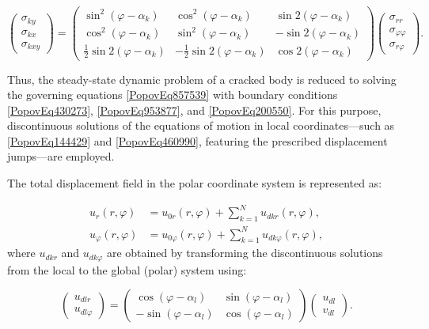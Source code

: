 \begin{equation} \label{PopovEq604994}
	\left(\begin{array}{c}
		\sigma_{ky} \\
		\sigma_{kx} \\
		\sigma_{kxy}
	\end{array}\right)
	=
	\left(\begin{array}{ccc}
		\sin^2(\varphi - \alpha_k) & \cos^2(\varphi - \alpha_k) & \sin 2(\varphi - \alpha_k) \\
		\cos^2(\varphi - \alpha_k) & \sin^2(\varphi - \alpha_k) & -\sin 2(\varphi - \alpha_k) \\
		\frac{1}{2} \sin 2(\varphi - \alpha_k) & -\frac{1}{2} \sin 2(\varphi - \alpha_k) & \cos 2(\varphi - \alpha_k)
	\end{array}\right)
	\left(\begin{array}{c}
		\sigma_{rr} \\
		\sigma_{\varphi\varphi} \\
		\sigma_{r\varphi}
	\end{array}\right).
\end{equation}

Thus, the steady-state dynamic problem of a cracked body is reduced to solving the governing equations \eqref{PopovEq857539} with boundary conditions \eqref{PopovEq430273}, \eqref{PopovEq953877}, and \eqref{PopovEq200550}. For this purpose, discontinuous solutions of the equations of motion in local coordinates—such as \eqref{PopovEq144429} and \eqref{PopovEq460990}, featuring the prescribed displacement jumps—are employed.

The total displacement field in the polar coordinate system is represented as:

\begin{equation} \label{PopovEq481837}
	\begin{aligned}
		u_r(r, \varphi) &= u_{0r}(r, \varphi) + \displaystyle\sum_{k=1}^{N} u_{dkr}(r, \varphi), \\
		u_{\varphi}(r, \varphi) &= u_{0\varphi}(r, \varphi) + \displaystyle\sum_{k=1}^{N} u_{dk\varphi}(r, \varphi),
	\end{aligned}
\end{equation}
where $u_{dkr}$ and $u_{dk\varphi}$ are obtained by transforming the discontinuous solutions from the local to the global (polar) system using:

\begin{equation} \label{31.46)}
	\left(\begin{array}{c}
		u_{dlr} \\
		u_{dl\varphi}
	\end{array}\right)
	=
	\left(\begin{array}{cc}
		\cos(\varphi - \alpha_l) & \sin(\varphi - \alpha_l) \\
		-\sin(\varphi - \alpha_l) & \cos(\varphi - \alpha_l)
	\end{array}\right)
	\left(\begin{array}{c}
		u_{dl} \\
		v_{dl}
	\end{array}\right).
\end{equation}

